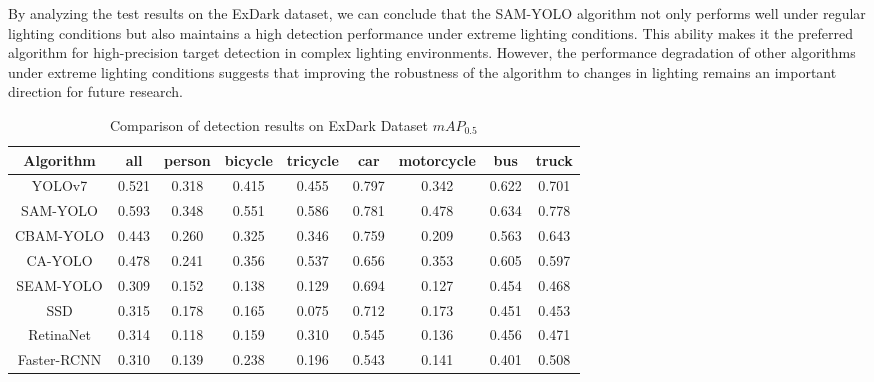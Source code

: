 \documentclass[aic]{iosart2x}
\begin{document}
By analyzing the test results on the ExDark dataset, we can conclude that the SAM-YOLO algorithm not only performs well under regular lighting conditions but also maintains a high detection performance under extreme lighting conditions. This ability makes it the preferred algorithm for high-precision target detection in complex lighting environments. However, the performance degradation of other algorithms under extreme lighting conditions suggests that improving the robustness of the algorithm to changes in lighting remains an important direction for future research.


\begin{table}[!htbp]
    \centering
    \caption{Comparison of detection results on ExDark Dataset $mAP_{0.5}$}
    \label{tab:comparative_experiment_ap_5_ExDark}
    \begin{tabular}{ccccccccc}
        \toprule  
 Algorithm   & all   & person & bicycle & tricycle & car   & motorcycle & bus   & truck \\ \midrule
 YOLOv7      & 0.521 & 0.318  & 0.415   & 0.455    & 0.797 & 0.342      & 0.622 & 0.701 \\
 SAM-YOLO    & 0.593 & 0.348  & 0.551   & 0.586    & 0.781 & 0.478      & 0.634 & 0.778 \\
 CBAM-YOLO   & 0.443 & 0.260  & 0.325   & 0.346    & 0.759 & 0.209      & 0.563 & 0.643 \\
 CA-YOLO     & 0.478 & 0.241  & 0.356   & 0.537    & 0.656 & 0.353      & 0.605 & 0.597 \\
 SEAM-YOLO   & 0.309 & 0.152  & 0.138   & 0.129    & 0.694 & 0.127      & 0.454 & 0.468 \\
 SSD         & 0.315 & 0.178  & 0.165   & 0.075    & 0.712 & 0.173      & 0.451 & 0.453 \\
 RetinaNet   & 0.314 & 0.118  & 0.159   & 0.310    & 0.545 & 0.136      & 0.456 & 0.471 \\ 
 Faster-RCNN & 0.310 & 0.139  & 0.238   & 0.196    & 0.543 & 0.141      & 0.401 & 0.508 \\ 
        \bottomrule
    \end{tabular}
\end{table}
\end{document}
